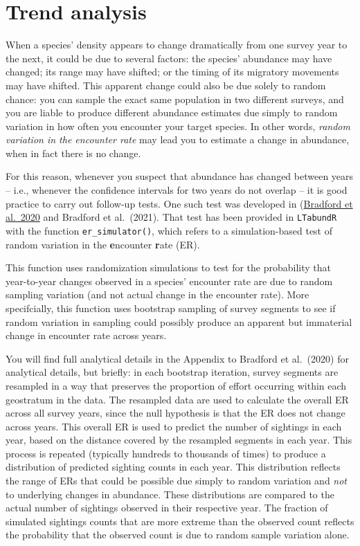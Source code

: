 \documentclass[
]{book}
\begin{document}
\hypertarget{trend-analysis}{%
\chapter{Trend analysis}\label{trend-analysis}}

When a species' density appears to change dramatically from one survey year to the next, it could be due to several factors: the species' abundance may have changed; its range may have shifted; or the timing of its migratory movements may have shifted. This apparent change could also be due solely to random chance: you can sample the exact same population in two different surveys, and you are liable to produce different abundance estimates due simply to random variation in how often you encounter your target species. In other words, \emph{random variation in the encounter rate} may lead you to estimate a change in abundance, when in fact there is no change.

For this reason, whenever you suspect that abundance has changed between years -- i.e., whenever the confidence intervals for two years do not overlap -- it is good practice to carry out follow-up tests. One such test was developed in (\href{https://www.fisheries.noaa.gov/inport/item/59592}{Bradford et al.~2020} and Bradford et al.~(2021). That test has been provided in \texttt{LTabundR} with the function \texttt{er\_simulator()}, which refers to a simulation-based test of random variation in the \textbf{e}ncounter \textbf{r}ate (ER).

This function uses randomization simulations to test for the probability that year-to-year changes observed in a species' encounter rate are due to random sampling variation (and not actual change in the encounter rate). More specifcially, this function uses bootstrap sampling of survey segments to see if random variation in sampling could possibly produce an apparent but immaterial change in encounter rate across years.

You will find full analytical details in the Appendix to Bradford et al.~(2020) for analytical details, but briefly: in each bootstrap iteration, survey segments are resampled in a way that preserves the proportion of effort occurring within each geostratum in the data. The resampled data are used to calculate the overall ER across all survey years, since the null hypothesis is that the ER does not change across years. This overall ER is used to predict the number of sightings in each year, based on the distance covered by the resampled segments in each year. This process is repeated (typically hundreds to thousands of times) to produce a distribution of predicted sighting counts in each year. This distribution reflects the range of ERs that could be possible due simply to random variation and \emph{not} to underlying changes in abundance. These distributions are compared to the actual number of sightings observed in their respective year. The fraction of simulated sightings counts that are more extreme than the observed count reflects the probability that the observed count is due to random sample variation alone.
\end{document}
